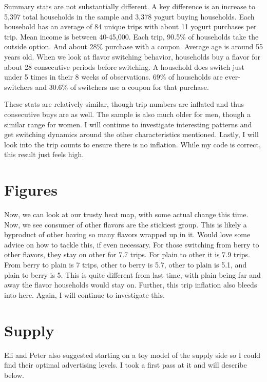 \documentclass[11pt]{article}
\theoremstyle{definition}
\theoremstyle{remark}
\begin{document}
Summary stats are not substantially different. A key difference is an increase to 5,397 total households in the sample and 3,378 yogurt buying households. Each household has an average of 84 unique trips with about 11 yogurt purchases per trip. Mean income is between 40-45,000. Each trip, 90.5\% of households take the outside option. And about 28\% purchase with a coupon. Average age is around 55 years old. When we look at flavor switching behavior, households buy a flavor for about 28 consecutive periods before switching. A household does switch just under 5 times in their 8 weeks of observations. 69\% of households are ever-switchers and 30.6\% of switchers use a coupon for that purchase.

These stats are relatively similar, though trip numbers are inflated and thus consecutive buys are as well. The sample is also much older for men, though a similar range for women. I will continue to investigate interesting patterns and get switching dynamics around the other characteristics mentioned. Lastly, I will look into the trip counts to ensure there is no inflation. While my code is correct, this result just feels high.

\section{Figures}

Now, we can look at our trusty heat map, with some actual change this time. Now, we see consumer of other flavors are the stickiest group. This is likely a byproduct of other having so many flavors wrapped up in it. Would love some advice on how to tackle this, if even necessary. For those switching from berry to other flavors, they stay on other for 7.7 trips. For plain to other it is 7.9 trips. From berry to plain is 7 trips, other to berry is 5.7, other to plain is 5.1, and plain to berry is 5. This is quite different from last time, with plain being far and away the flavor households would stay on. Further, this trip inflation also bleeds into here. Again, I will continue to investigate this. 

\section{Supply}

Eli and Peter also suggested starting on a toy model of the supply side so I could find their optimal advertising levels. I took a first pass at it and will describe below.
\end{document}

